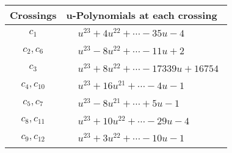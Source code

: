 \documentclass[1p]{elsarticle_modified}
\theoremstyle{definition}
\begin{document}
\begin{tabular}{m{50pt}|m{274pt}}
Crossings & \hspace{64pt}u-Polynomials at each crossing \\
\hline $$\begin{aligned}c_{1}\end{aligned}$$&$\begin{aligned}
&u^{23}+4 u^{22}+\cdots-35 u-4
\end{aligned}$\\
\hline $$\begin{aligned}c_{2},c_{6}\end{aligned}$$&$\begin{aligned}
&u^{23}-8 u^{22}+\cdots-11 u+2
\end{aligned}$\\
\hline $$\begin{aligned}c_{3}\end{aligned}$$&$\begin{aligned}
&u^{23}+8 u^{22}+\cdots-17339 u+16754
\end{aligned}$\\
\hline $$\begin{aligned}c_{4},c_{10}\end{aligned}$$&$\begin{aligned}
&u^{23}+16 u^{21}+\cdots-4 u-1
\end{aligned}$\\
\hline $$\begin{aligned}c_{5},c_{7}\end{aligned}$$&$\begin{aligned}
&u^{23}-8 u^{21}+\cdots+5 u-1
\end{aligned}$\\
\hline $$\begin{aligned}c_{8},c_{11}\end{aligned}$$&$\begin{aligned}
&u^{23}+10 u^{22}+\cdots-29 u-4
\end{aligned}$\\
\hline $$\begin{aligned}c_{9},c_{12}\end{aligned}$$&$\begin{aligned}
&u^{23}+3 u^{22}+\cdots-10 u-1
\end{aligned}$\\
\hline
\end{tabular}\\~\\
\newpage\renewcommand{\arraystretch}{1}
\end{document}

